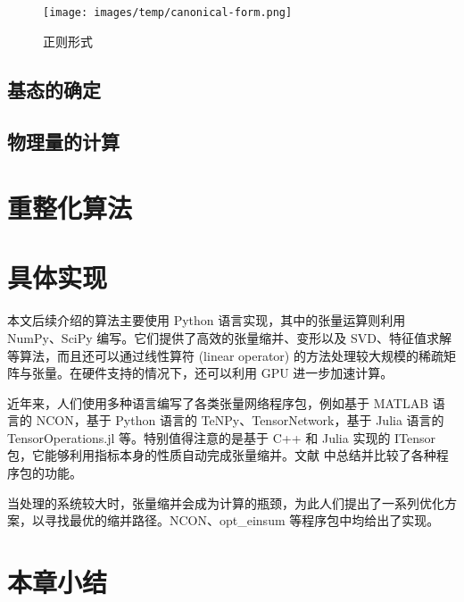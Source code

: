 \begin{figure}[htb]
  \centering
  \texttt{[image: images/temp/canonical-form.png]}
  \caption{正则形式}
  \label{fig:mps-canonical-form}
\end{figure}

\subsection{基态的确定}

\subsection{物理量的计算}

\section{重整化算法}

\section{具体实现}

本文后续介绍的算法主要使用 Python 语言实现，其中的张量运算则利用 NumPy\cite{harris2020array}、SciPy\cite{virtanen2020scipy} 编写。它们提供了高效的张量缩并、变形以及 SVD、特征值求解等算法，而且还可以通过线性算符 (linear operator) 的方法处理较大规模的稀疏矩阵与张量。在硬件支持的情况下，还可以利用 GPU 进一步加速计算。

近年来，人们使用多种语言编写了各类张量网络程序包，例如基于 MATLAB 语言的 NCON\cite{pfeifer2014ncon}，基于 Python 语言的 TeNPy\cite{hauschild2018efficient}、TensorNetwork\cite{roberts2019tensornetwork}，基于 Julia 语言的 TensorOperations.jl\cite{jutho2023tensoroperations} 等。特别值得注意的是基于 C++ 和 Julia 实现的 ITensor\cite{fishman2022itensor} 包，它能够利用指标本身的性质自动完成张量缩并。文献 \parencite{psarras2021landscape} 中总结并比较了各种程序包的功能。

当处理的系统较大时，张量缩并会成为计算的瓶颈，为此人们提出了一系列优化方案\cite{pfeifer2014faster,evenbly2014improving}，以寻找最优的缩并路径。NCON、opt\_einsum\cite{daniel2018opteinsum} 等程序包中均给出了实现。

\section{本章小结}
